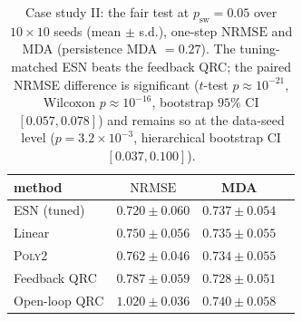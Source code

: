 ﻿\documentclass[10pt,conference]{IEEEtran}
\newcommand{\nrmse}{\mathrm{NRMSE}}
\begin{document}
\begin{table}[H]
\centering
\caption{Case study II: the fair test at $p_{\mathrm{sw}}=0.05$ over
$10\times10$ seeds (mean $\pm$ s.d.), one-step $\nrmse$ and MDA (persistence
MDA $=0.27$). The tuning-matched ESN beats the feedback QRC; the paired NRMSE
difference is significant ($t$-test $p\approx10^{-21}$, Wilcoxon
$p\approx10^{-16}$, bootstrap $95\%$ CI $[0.057,0.078]$) and remains so at the
data-seed level ($p=3.2\times10^{-3}$, hierarchical bootstrap CI
$[0.037,0.100]$).}
\label{tab:fb}
\begin{tabular}{lccc}
\toprule
method & $\nrmse$ & MDA & \\
\midrule
ESN (tuned)      & $0.720\pm0.060$ & $0.737\pm0.054$ & \\
Linear           & $0.750\pm0.056$ & $0.735\pm0.055$ & \\
\textsc{Poly2}   & $0.762\pm0.046$ & $0.734\pm0.055$ & \\
Feedback QRC     & $0.787\pm0.059$ & $0.728\pm0.051$ & \\
Open-loop QRC    & $1.020\pm0.036$ & $0.740\pm0.058$ & \\
\bottomrule
\end{tabular}
\end{table}
\end{document}
